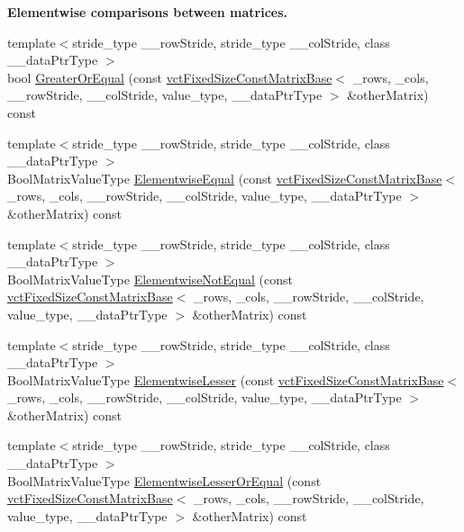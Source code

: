 \begin{Indent}{\bf Elementwise comparisons between matrices.}
\begin{DoxyCompactItemize}
\item 
{\footnotesize template$<$stride\+\_\+type \+\_\+\+\_\+row\+Stride, stride\+\_\+type \+\_\+\+\_\+col\+Stride, class \+\_\+\+\_\+data\+Ptr\+Type $>$ }\\bool \hyperlink{classvct_fixed_size_const_matrix_base_ac993327f1a65975912edee4cca952352}{Greater\+Or\+Equal} (const \hyperlink{classvct_fixed_size_const_matrix_base}{vct\+Fixed\+Size\+Const\+Matrix\+Base}$<$ \+\_\+rows, \+\_\+cols, \+\_\+\+\_\+row\+Stride, \+\_\+\+\_\+col\+Stride, value\+\_\+type, \+\_\+\+\_\+data\+Ptr\+Type $>$ \&other\+Matrix) const 
\item 
{\footnotesize template$<$stride\+\_\+type \+\_\+\+\_\+row\+Stride, stride\+\_\+type \+\_\+\+\_\+col\+Stride, class \+\_\+\+\_\+data\+Ptr\+Type $>$ }\\Bool\+Matrix\+Value\+Type \hyperlink{classvct_fixed_size_const_matrix_base_a8b806f5df4aed992388b48d16257adda}{Elementwise\+Equal} (const \hyperlink{classvct_fixed_size_const_matrix_base}{vct\+Fixed\+Size\+Const\+Matrix\+Base}$<$ \+\_\+rows, \+\_\+cols, \+\_\+\+\_\+row\+Stride, \+\_\+\+\_\+col\+Stride, value\+\_\+type, \+\_\+\+\_\+data\+Ptr\+Type $>$ \&other\+Matrix) const 
\item 
{\footnotesize template$<$stride\+\_\+type \+\_\+\+\_\+row\+Stride, stride\+\_\+type \+\_\+\+\_\+col\+Stride, class \+\_\+\+\_\+data\+Ptr\+Type $>$ }\\Bool\+Matrix\+Value\+Type \hyperlink{classvct_fixed_size_const_matrix_base_a5809f299296289e85bbcba58fe80ba22}{Elementwise\+Not\+Equal} (const \hyperlink{classvct_fixed_size_const_matrix_base}{vct\+Fixed\+Size\+Const\+Matrix\+Base}$<$ \+\_\+rows, \+\_\+cols, \+\_\+\+\_\+row\+Stride, \+\_\+\+\_\+col\+Stride, value\+\_\+type, \+\_\+\+\_\+data\+Ptr\+Type $>$ \&other\+Matrix) const 
\item 
{\footnotesize template$<$stride\+\_\+type \+\_\+\+\_\+row\+Stride, stride\+\_\+type \+\_\+\+\_\+col\+Stride, class \+\_\+\+\_\+data\+Ptr\+Type $>$ }\\Bool\+Matrix\+Value\+Type \hyperlink{classvct_fixed_size_const_matrix_base_a8a3cc5e0f39d2f830e969a7b287fdae1}{Elementwise\+Lesser} (const \hyperlink{classvct_fixed_size_const_matrix_base}{vct\+Fixed\+Size\+Const\+Matrix\+Base}$<$ \+\_\+rows, \+\_\+cols, \+\_\+\+\_\+row\+Stride, \+\_\+\+\_\+col\+Stride, value\+\_\+type, \+\_\+\+\_\+data\+Ptr\+Type $>$ \&other\+Matrix) const 
\item 
{\footnotesize template$<$stride\+\_\+type \+\_\+\+\_\+row\+Stride, stride\+\_\+type \+\_\+\+\_\+col\+Stride, class \+\_\+\+\_\+data\+Ptr\+Type $>$ }\\Bool\+Matrix\+Value\+Type \hyperlink{classvct_fixed_size_const_matrix_base_a829684bd56fa8e2169be5e280c61413b}{Elementwise\+Lesser\+Or\+Equal} (const \hyperlink{classvct_fixed_size_const_matrix_base}{vct\+Fixed\+Size\+Const\+Matrix\+Base}$<$ \+\_\+rows, \+\_\+cols, \+\_\+\+\_\+row\+Stride, \+\_\+\+\_\+col\+Stride, value\+\_\+type, \+\_\+\+\_\+data\+Ptr\+Type $>$ \&other\+Matrix) const 

\end{DoxyCompactItemize}
\end{Indent}
